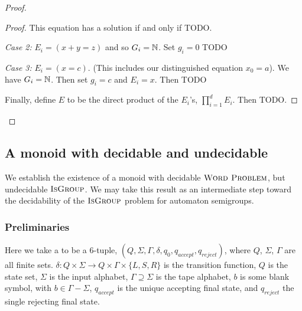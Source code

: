 \documentclass[11pt]{article}
\begin{document}
\begin{proof}
\begin{proof}
  This equation has a solution if and only if TODO.

  \textit{Case 2:} $E_i = (x+y=z)$ and so $G_i= \mathbb{N}$. Set $g_i = 0$ TODO

  \textit{Case 3:} $E_i = (x = c)$. (This includes our distinguished
  equation $x_0 = a$). We have $G_i = \mathbb{N}$. Then set $g_i = c$ and
  $E_i = x$. Then TODO

  Finally, define $E$ to be the direct product of the $E_i$'s,
  $\prod_{i=1}^d E_i$. Then TODO.
\end{proof} %



\end{proof} %

\subsection{A monoid with decidable  and undecidable } 

We establish the existence of a monoid with decidable
$\textsc{Word Problem}$, but undecidable $\textsc{IsGroup}$. We may
take this result as an intermediate step toward the decidability of
the $\textsc{IsGroup}$ problem for automaton semigroups.

\subsubsection*{Preliminaries}
Here we take a  to be a 6-tuple,
$(Q, \Sigma, \Gamma, \delta, q_0, q_{accept}, q_{reject})$, where $Q$,
$\Sigma$, $\Gamma$ are all finite sets.
$\delta : Q \times \Sigma \rightarrow Q\times \Gamma \times \{L,S,R\}$
is the transition function, $Q$ is the state set, $\Sigma$ is the
input alphabet, $\Gamma \supseteq \Sigma$ is the tape alphabet, $b$ is
some blank symbol, with $b \in \Gamma - \Sigma$, $q_{accept}$ is the
unique accepting final state, and $q_{reject}$ the single rejecting
final state.
\end{document}
